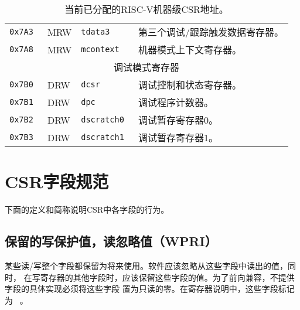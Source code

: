 \begin{table}[htb!]
\begin{center}
\begin{tabular}{|l|l|l|l|}
\tt 0x7A3 & MRW &\tt tdata3 & 第三个调试/跟踪触发数据寄存器。 \\
\tt 0x7A8 & MRW &\tt mcontext & 机器模式上下文寄存器。 \\
\hline
\multicolumn{4}{|c|}{调试模式寄存器 } \\
\hline
\tt 0x7B0 & DRW &\tt dcsr & 调试控制和状态寄存器。 \\
\tt 0x7B1 & DRW &\tt dpc & 调试程序计数器。 \\
\tt 0x7B2 & DRW &\tt dscratch0 & 调试暂存寄存器0。 \\
\tt 0x7B3 & DRW &\tt dscratch1 & 调试暂存寄存器1。 \\
\hline
\end{tabular}
\end{center}
\caption{当前已分配的RISC-V机器级CSR地址。
    }
\label{mcsrnames1}
\end{table}

\clearpage

\section{CSR字段规范
}



下面的定义和简称说明CSR中各字段的行为。

\subsection*{保留的写保护值，读忽略值（WPRI）}


某些读/写整个字段都保留为将来使用。软件应该忽略从这些字段中读出的值，同时，
在写寄存器的其他字段时，应该保留这些字段的值。为了前向兼容，不提供字段的具体实现必须将这些字段
置为只读的零。在寄存器说明中，这些字段标记为 \wpri\ 。


